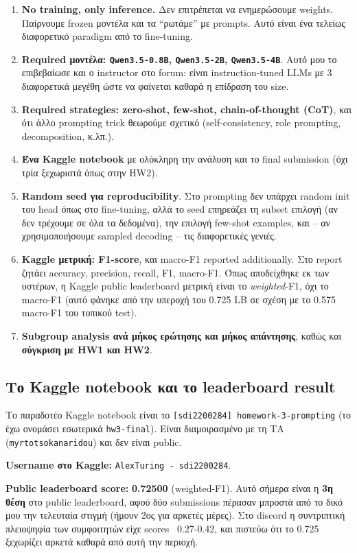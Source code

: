 \documentclass[12pt]{fphw}
\begin{document}
\begin{enumerate}
    \item \textbf{No training, only inference.} Δεν επιτρέπεται να ενημερώσουμε weights. Παίρνουμε frozen μοντέλα και τα ``ρωτάμε'' με prompts. Αυτό είναι ένα τελείως διαφορετικό paradigm από το fine-tuning.
    \item \textbf{Required μοντέλα: \texttt{Qwen3.5-0.8B}, \texttt{Qwen3.5-2B}, \texttt{Qwen3.5-4B}}. Αυτό μου το επιβεβαίωσε και ο instructor στο forum: είναι instruction-tuned LLMs με 3 διαφορετικά μεγέθη ώστε να φαίνεται καθαρά η επίδραση του size.
    \item \textbf{Required strategies: zero-shot, few-shot, chain-of-thought (CoT)}, και ότι άλλο prompting trick θεωρούμε σχετικό (self-consistency, role prompting, decomposition, κ.λπ.).
    \item \textbf{Ένα Kaggle notebook} με ολόκληρη την ανάλυση και το final submission (όχι τρία ξεχωριστά όπως στην HW2).
    \item \textbf{Random seed για reproducibility}. Στο prompting δεν υπάρχει random init του head όπως στο fine-tuning, αλλά το seed επηρεάζει τη subset επιλογή (αν δεν τρέχουμε σε όλα τα δεδομένα), την επιλογή few-shot examples, και -- αν χρησιμοποιήσουμε sampled decoding -- τις διαφορετικές γενιές.
    \item \textbf{Kaggle μετρική: F1-score}, και macro-F1 reported additionally. Στο report ζητάει accuracy, precision, recall, F1, macro-F1. Όπως αποδείχθηκε εκ των υστέρων, η Kaggle public leaderboard μετρική είναι το \emph{weighted}-F1, όχι το macro-F1 (αυτό φάνηκε από την υπεροχή του 0.725 LB σε σχέση με το 0.575 macro-F1 του τοπικού test).
    \item \textbf{Subgroup analysis ανά μήκος ερώτησης και μήκος απάντησης}, καθώς και \textbf{σύγκριση με HW1 και HW2}.
\end{enumerate}

\subsection{Το Kaggle notebook και το leaderboard result}

Το παραδοτέο Kaggle notebook είναι το \texttt{[sdi2200284] homework-3-prompting} (το έχω ονομάσει εσωτερικά \texttt{hw3-final}). Είναι διαμοιρασμένο με τη ΤΑ (\texttt{myrtotsokanaridou}) και δεν είναι public.

\textbf{Username στο Kaggle:} \texttt{AlexTuring - sdi2200284}.

\textbf{Public leaderboard score:} \textbf{0.72500} (weighted-F1). Αυτό σήμερα είναι η \textbf{3η θέση} στο public leaderboard, αφού δύο submissions πέρασαν μπροστά από το δικό μου την τελευταία στιγμή (ήμουν 2ος για αρκετές μέρες). Στο discord η συντριπτική πλειοψηφία των συμφοιτητών είχε scores ~0.27-0.42, και πιστεύω ότι το 0.725 ξεχωρίζει αρκετά καθαρά από αυτή την περιοχή.
\end{document}
